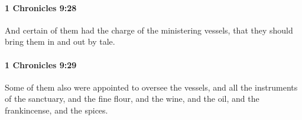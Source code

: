 		\paragraph{1 Chronicles 9:28} %
			\label{1CHRONICLES-9-28}

			And certain of them had the charge of the ministering vessels, that they should bring them in and out by tale.


		\paragraph{1 Chronicles 9:29} %
			\label{1CHRONICLES-9-29}

			Some of them also were appointed to oversee the vessels, and all the instruments of the sanctuary, and the fine flour, and the wine, and the oil, and the frankincense, and the spices.



